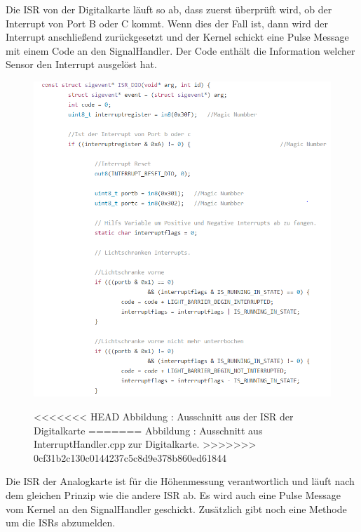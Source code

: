 \documentclass[a4paper, 11pt]{article}
\begin{document}
Die ISR von der Digitalkarte läuft so ab, dass zuerst überprüft wird, ob der Interrupt von Port B oder C kommt. Wenn dies der Fall ist, dann wird der Interrupt anschließend zurückgesetzt und der Kernel schickt eine Pulse Message mit einem Code an den SignalHandler. Der Code enthält die Information welcher Sensor den Interrupt ausgelöst hat.

\newpage

\begin{figure}[h]
\centering 
    \includegraphics[scale=0.7]{ISR/isrdig.png}
    
<<<<<<< HEAD
    \small Abbildung \theimgcounter : Ausschnitt aus der ISR der Digitalkarte
=======
    \small Abbildung \theimgcounter : Ausschnitt aus InterruptHandler.cpp zur Digitalkarte.
>>>>>>> 0cf31b2c130c0144237c5c8d9e378b860ed61844
    \label{isrdig}
\end{figure}

Die ISR der Analogkarte ist für die Höhenmessung verantwortlich und läuft nach dem gleichen Prinzip wie die andere ISR ab. Es wird auch eine Pulse Message vom Kernel an den SignalHandler geschickt. Zusätzlich gibt noch eine Methode um die ISRs abzumelden.

\newpage
\end{document}
